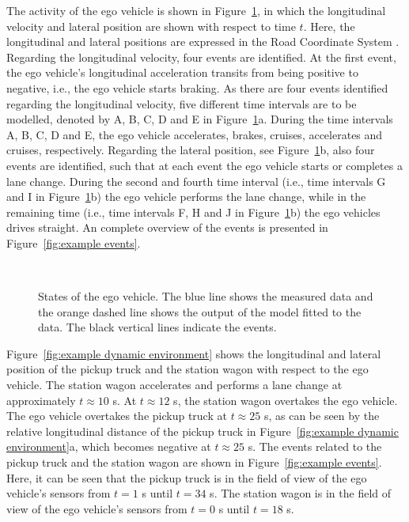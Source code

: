The activity of the ego vehicle is shown in Figure~\ref{fig:example ego states}, in which the longitudinal velocity and lateral position are shown with respect to time $t$. Here, the longitudinal and lateral positions are expressed in the Road Coordinate System \cite{zofka2015datadrivetrafficscenarios}. Regarding the longitudinal velocity, four events are identified. At the first event, the ego vehicle's longitudinal acceleration transits from being positive to negative, i.e., the ego vehicle starts braking. As there are four events identified regarding the longitudinal velocity, five different time intervals are to be modelled, denoted by A, B, C, D and E in Figure~\ref{fig:example ego states}a. During the time intervals A, B, C, D and E, the ego vehicle accelerates, brakes, cruises, accelerates and cruises, respectively. Regarding the lateral position, see Figure~\ref{fig:example ego states}b, also four events are identified, such that at each event the ego vehicle starts or completes a lane change. During the second and fourth time interval (i.e., time intervals G and I in Figure~\ref{fig:example ego states}b) the ego vehicle performs the lane change, while in the remaining time (i.e., time intervals F, H and J in Figure~\ref{fig:example ego states}b) the ego vehicles drives straight. An complete overview of the events is presented in Figure~\ref{fig:example events}.

\begin{figure}
	\centering
	\setlength\figureheight{150pt}
	\setlength\figurewidth{248pt}
	\\
	\caption{States of the ego vehicle. The blue line shows the measured data and the orange dashed line shows the output of the model fitted to the data. The black vertical lines indicate the events.}
	\label{fig:example ego states}
\end{figure}

Figure~\ref{fig:example dynamic environment} shows the longitudinal and lateral position of the pickup truck and the station wagon with respect to the ego vehicle. The station wagon accelerates and performs a lane change at approximately $t\approx10$ s. At $t\approx12$ s, the station wagon overtakes the ego vehicle. The ego vehicle overtakes the pickup truck at $t\approx25$ s, as can be seen by the relative longitudinal distance of the pickup truck in Figure~\ref{fig:example dynamic environment}a, which becomes negative at $t\approx25$ s. The events related to the pickup truck and the station wagon are shown in Figure~\ref{fig:example events}. Here, it can be seen that the pickup truck is in the field of view of the ego vehicle's sensors from $t=1$ s until $t=34$ s. The station wagon is in the field of view of the ego vehicle's sensors from $t=0$ s until $t=18$ s.

